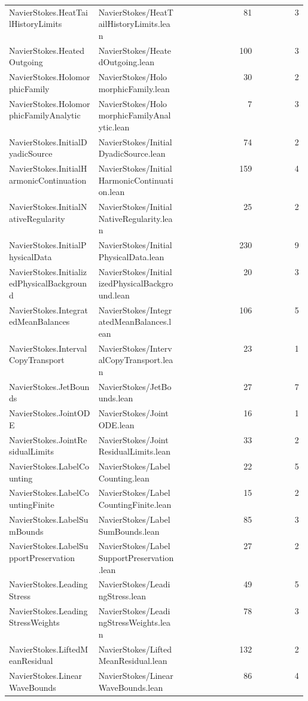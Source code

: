 \begin{longtable}{p{0.30\linewidth}p{0.28\linewidth}rr}
NavierStokes.HeatTailHistoryLimits & NavierStokes/HeatTailHistoryLimits.lean & 81 & 3\\
NavierStokes.HeatedOutgoing & NavierStokes/HeatedOutgoing.lean & 100 & 3\\
NavierStokes.HolomorphicFamily & NavierStokes/HolomorphicFamily.lean & 30 & 2\\
NavierStokes.HolomorphicFamilyAnalytic & NavierStokes/HolomorphicFamilyAnalytic.lean & 7 & 3\\
NavierStokes.InitialDyadicSource & NavierStokes/InitialDyadicSource.lean & 74 & 2\\
NavierStokes.InitialHarmonicContinuation & NavierStokes/InitialHarmonicContinuation.lean & 159 & 4\\
NavierStokes.InitialNativeRegularity & NavierStokes/InitialNativeRegularity.lean & 25 & 2\\
NavierStokes.InitialPhysicalData & NavierStokes/InitialPhysicalData.lean & 230 & 9\\
NavierStokes.InitializedPhysicalBackground & NavierStokes/InitializedPhysicalBackground.lean & 20 & 3\\
NavierStokes.IntegratedMeanBalances & NavierStokes/IntegratedMeanBalances.lean & 106 & 5\\
NavierStokes.IntervalCopyTransport & NavierStokes/IntervalCopyTransport.lean & 23 & 1\\
NavierStokes.JetBounds & NavierStokes/JetBounds.lean & 27 & 7\\
NavierStokes.JointODE & NavierStokes/JointODE.lean & 16 & 1\\
NavierStokes.JointResidualLimits & NavierStokes/JointResidualLimits.lean & 33 & 2\\
NavierStokes.LabelCounting & NavierStokes/LabelCounting.lean & 22 & 5\\
NavierStokes.LabelCountingFinite & NavierStokes/LabelCountingFinite.lean & 15 & 2\\
NavierStokes.LabelSumBounds & NavierStokes/LabelSumBounds.lean & 85 & 3\\
NavierStokes.LabelSupportPreservation & NavierStokes/LabelSupportPreservation.lean & 27 & 2\\
NavierStokes.LeadingStress & NavierStokes/LeadingStress.lean & 49 & 5\\
NavierStokes.LeadingStressWeights & NavierStokes/LeadingStressWeights.lean & 78 & 3\\
NavierStokes.LiftedMeanResidual & NavierStokes/LiftedMeanResidual.lean & 132 & 2\\
NavierStokes.LinearWaveBounds & NavierStokes/LinearWaveBounds.lean & 86 & 4\\

\end{longtable}
